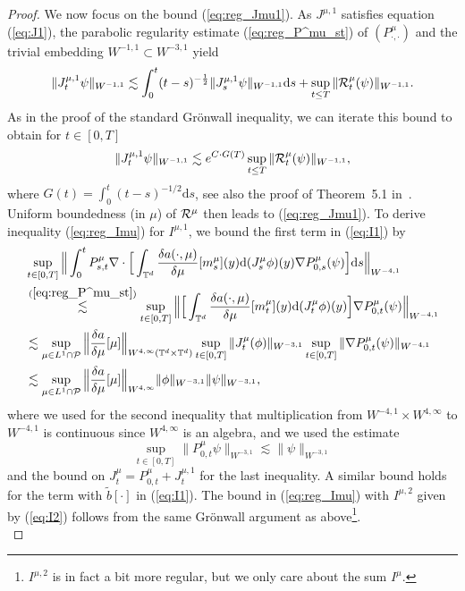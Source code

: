 \begin{proof}
We now focus on the bound (\ref{eq:reg_Jmu1}). As $J^{\mu,1}$ satisfies equation (\ref{eq:J1}), the parabolic regularity estimate (\ref{eq:reg_P^mu_st}) of $(P^{\mu}_{\cdot,\cdot})$ and the trivial embedding $W^{-1,1} \subset W^{-3,1}$ yield
\begin{align*}
\|J_t^{\mu,1} \psi \|_{W^{-1,1}} \lesssim \int_0^t (t-s)^{-\frac{1}{2}}\|J_s^{\mu,1} \psi\|_{W^{-1,1}} \mathrm{d}s + \sup_{t \leq T}\|\mathcal{R}_t^{\mu}(\psi)\|_{W^{-1,1}}.
\end{align*}
As in the proof of the standard Gr\"onwall inequality, we can iterate this bound to obtain for $t \in [0,T]$
\begin{align*}
    \|J_t^{\mu,1} \psi \|_{W^{-1,1}} \lesssim e^{C \cdot G(T)} \sup_{t \leq T}\|\mathcal{R}_t^{\mu}(\psi)\|_{W^{-1,1}},
\end{align*}
where $G(t) = \int_0^t (t-s)^{-1/2} \mathrm{d}s$, see also the proof of Theorem~5.1 in~\cite{Ethier1986}.
Uniform boundedness (in $\mu$) of $\mathcal{R}^{\mu}$ then leads to (\ref{eq:reg_Jmu1}). To derive inequality (\ref{eq:reg_Imu}) for $I^{\mu,1}$, we bound the first term in (\ref{eq:I1}) by 
\begin{align*}
&\sup_{t \in [0,T]}\Big\|\int_0^t P^{\mu}_{s,t}\nabla \cdot \Big[\int_{\mathbb{T}^d}\frac{\delta a(\cdot, \mu)}{\delta \mu}[m^{\mu}_s](y) \mathrm{d}(J_s^{\mu}\phi)(y) \nabla P_{0,s}^{\mu}(\psi)\Big]\mathrm{d}s\Big\|_{W^{-4,1}}\\
& \overset{(\ref{eq:reg_P^mu_st})}{\lesssim}\sup_{t \in [0,T]}\Big\| \Big[\int_{\mathbb{T}^d}\frac{\delta a(\cdot, \mu)}{\delta \mu}[m^{\mu}_t](y) \mathrm{d}(J_t^{\mu}\phi)(y)\Big] \nabla P_{0,t}^{\mu}(\psi)\Big\|_{W^{-4,1}}\\
& \lesssim \sup_{\mu \in L^1 \cap \mathcal{P}}\Big\|\frac{\delta a}{\delta \mu}[\mu]\Big\|_{W^{4,\infty}(\mathbb T^d \times \mathbb T^d)} \sup_{t \in [0,T]}\|J^{\mu}_t(\phi)\|_{W^{-3,1}} \sup_{t \in [0,T]}\|\nabla P_{0,t}^{\mu}(\psi)\|_{W^{-4,1}}\\
& \lesssim\sup_{\mu \in L^1 \cap \mathcal{P}}\Big\|\frac{\delta a}{\delta \mu}[\mu]\Big\|_{W^{4,\infty}} \|\phi\|_{W^{-3,1}}\|\psi\|_{W^{-3,1}},
\end{align*}
where we used for the second inequality that multiplication from $W^{-4,1}\times W^{4,\infty}$ to $W^{-4,1}$ is continuous since $W^{4,\infty}$ is an algebra, and we used the estimate
\[
\sup_{t \in [0,T]}\|P^{\mu}_{0,t}\psi\|_{W^{-3,1}} \lesssim \|\psi\|_{W^{-3,1}}
\]
and the bound on $J_t^{\mu} = P^{\mu}_{0,t} + J^{\mu,1}_t$ for the last inequality. A similar bound holds for the term with $\tilde{b}[\cdot]$ in (\ref{eq:I1}). The bound in (\ref{eq:reg_Imu}) with $I^{\mu,2}$ given by (\ref{eq:I2}) follows from the same Gr\"onwall argument as above\footnote{$I^{\mu,2}$ is in fact a bit more regular, but we only care about the sum $I^{\mu}$.}. \\


\end{proof}
